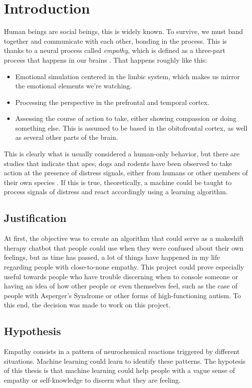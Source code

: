 \chapter{Introduction}
Human beings are social beings, this is widely known. To survive, we must band together and communicate with each other, bonding in the process. This is thanks to a neural process called \textit{empathy}, which is defined as a three-part process that happens in our brains \citep{rf1}. That happens roughly like this:
\begin{itemize}
	\item Emotional simulation centered in the limbic system, which makes us mirror the emotional elements we're watching.
	\item Processing the perspective in the prefrontal and temporal cortex.
	\item Assessing the course of action to take, either showing compassion or doing something else. This is assumed to be based in the obitofrontal cortex, as well as several other parts of the brain.
\end{itemize}
This is clearly what is usually considered a human-only behavior, but there are studies that indicate that apes, dogs and rodents have been observed to take action at the presence of distress signals, either from humans or other members of their own species \citep{rf2}.
If this is true, theoretically, a machine could be taught to process signals of distress and react accordingly using a learning algorithm.

\section{Justification}
At first, the objective was to create an algorithm that could serve as a makeshift therapy chatbot that people could use when they were confused about their own feelings, but as time has passed, a lot of things have happened in my life regarding people with close-to-none empathy.
This project could prove especially useful towards people who have trouble discerning when to console someone or having an idea of how other people or even themselves feel, such as the case of people with Asperger's Syndrome or other forms of high-functioning autism.
To this end, the decision was made to work on this project.

\section{Hypothesis}
Empathy consists in a pattern of neurochemical reactions triggered by different situations. Machine learning could learn to identify these patterns. The hypotesis of this thesis is that machine learning could help people with a vague sense of empathy or self-knowledge to discern what they are feeling.

